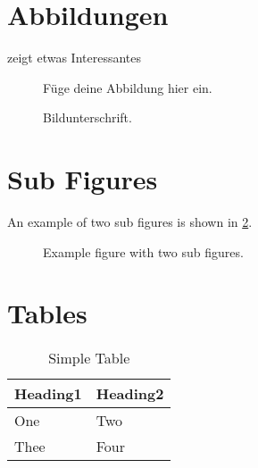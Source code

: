 \documentclass[
  fontsize=10pt,
  numbers=noenddot,
  english,  %
  paper=a5,
  twoside,  %
  DIV=calc,
  headings=small,
  bibliography=totoc,
  listof=totoc,
  draft=false
]{scrbook}
\theoremstyle{break}
\begin{document}
\section{Abbildungen}

\begin{ltgexample}
 zeigt etwas Interessantes

\begin{figure}
  \centering
  Füge deine Abbildung hier ein.
  \caption{Bildunterschrift.}
  \label{fig:label}
\end{figure}
\end{ltgexample}

\section{Sub Figures}

An example of two sub figures is shown in \cref{fig:two_sub_figures}.

\begin{ltgexample}
\begin{figure}[!b]
  \centering
  \hfil
  \caption{Example figure with two sub figures.}
  \label{fig:two_sub_figures}
\end{figure}
\end{ltgexample}

\section{Tables}

\begin{ltgexample}
\begin{table}
  \caption{Simple Table}
  \label{tab:simple}
  \centering
  \begin{tabular}{ll}
    \toprule
    Heading1 & Heading2 \\
    \midrule
    One      & Two      \\
    Thee     & Four     \\
    \bottomrule
  \end{tabular}
\end{table}
\end{ltgexample}
\end{document}
